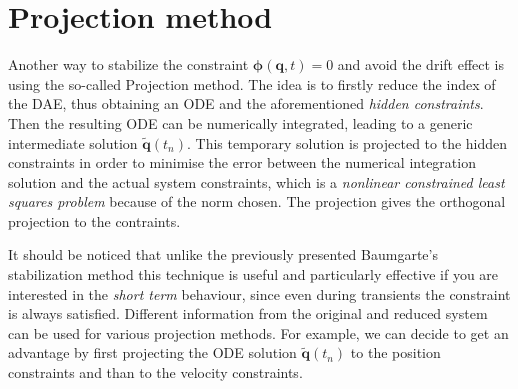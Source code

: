 %
%
\section{Projection method}
Another way to stabilize the constraint $\bm{\phi}(\bm{q},t)=0$ and avoid the drift
effect is using the so-called Projection method.
The idea is to firstly reduce the index of the DAE, thus obtaining an ODE
and the aforementioned \emph{hidden constraints}.
Then the resulting ODE can be numerically integrated, leading to a generic
intermediate solution $\widetilde{\bm{q}}(t_n)$.
This temporary solution is projected to the hidden constraints in order to
minimise the error between the numerical integration solution and the actual
system constraints, which is a \textit{nonlinear constrained least squares problem}
because of the norm chosen.
The projection gives the orthogonal projection to the contraints.

It should be noticed that unlike the previously presented Baumgarte's stabilization
method this technique is useful and particularly effective if you are interested
in the \emph{short term} behaviour, since even during transients the constraint
is always satisfied.
Different information from the original and reduced system can be used for
various projection methods. For example, we can decide to get an advantage
by first projecting the ODE solution $\widetilde{\bm{q}}(t_n)$ to the position
constraints and than to the velocity constraints.

